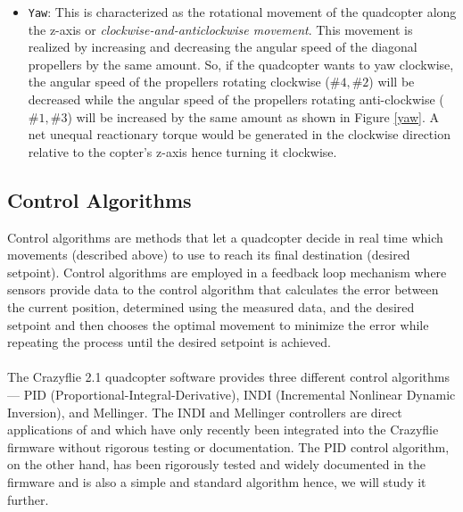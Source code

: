 \documentclass[10pt, a4paper]{article}
\newcommand{\textDef}[1]{\texttt{#1}}
\newcommand{\fig}[1]{Figure \ref{#1}}
\begin{document}
\begin{itemize}
        \item \textDef{Yaw}: This is characterized as the rotational movement of the quadcopter along the z-axis or \textit{clockwise-and-anticlockwise movement}. This movement is realized by increasing and decreasing the angular speed of the diagonal propellers by the same amount. So, if the quadcopter wants to yaw clockwise, the angular speed of the propellers rotating clockwise ($\#4, \#2$) will be decreased while the angular speed of the propellers rotating anti-clockwise ($\#1, \#3$) will be increased by the same amount as shown in \fig{yaw}. A net unequal reactionary torque would be generated in the clockwise direction relative to the copter's z-axis hence turning it clockwise.
    \end{itemize}
    
    \subsection{Control Algorithms}
    Control algorithms are methods that let a quadcopter decide in real time which movements (described above) to use to reach its final destination (desired setpoint). Control algorithms are employed in a feedback loop mechanism where sensors provide data to the control algorithm that calculates the error between the current position, determined using the measured data, and the desired setpoint and then chooses the optimal movement to minimize the error while repeating the process until the desired setpoint is achieved. 
    \\ \\
    The Crazyflie 2.1 quadcopter software provides three different control algorithms--- PID (Proportional-Integral-Derivative), INDI (Incremental Nonlinear Dynamic Inversion), and Mellinger. The INDI and Mellinger controllers are direct applications of \cite{INDI} and \cite{Mellinger} which have only recently been integrated into the Crazyflie firmware without rigorous testing or documentation. The PID control algorithm, on the other hand, has been rigorously tested and widely documented in the firmware and is also a simple and standard algorithm hence, we will study it further.
\end{document}

